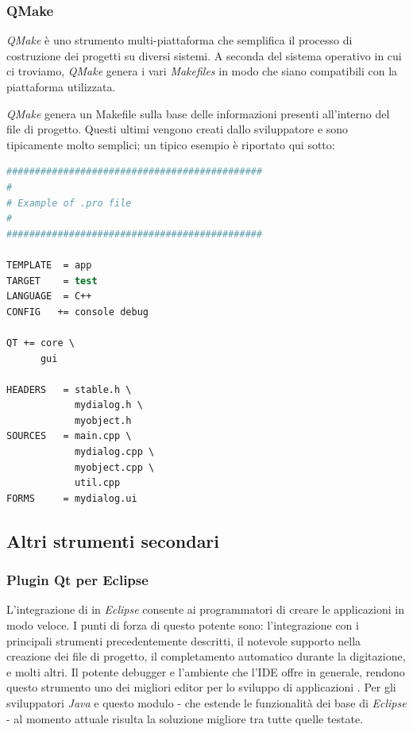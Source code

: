 \subsubsection{QMake}
\emph{QMake} è uno strumento multi-piattaforma che semplifica il processo di costruzione dei progetti \qt{} su diversi sistemi. A seconda del sistema operativo in cui ci troviamo, \emph{QMake} genera i vari  \emph{Makefiles} in modo che siano compatibili con la piattaforma utilizzata.

\emph{QMake} genera un Makefile sulla base delle informazioni presenti all'interno del file di progetto. Questi ultimi vengono creati dallo sviluppatore e sono tipicamente molto semplici; un tipico esempio è riportato qui sotto:

\begin{lstlisting}[language=csh]
#############################################
#
# Example of .pro file
#
#############################################

TEMPLATE  = app
TARGET    = test
LANGUAGE  = C++
CONFIG   += console debug

QT += core \
      gui

HEADERS   = stable.h \
            mydialog.h \
            myobject.h
SOURCES   = main.cpp \
            mydialog.cpp \
            myobject.cpp \
            util.cpp
FORMS     = mydialog.ui
\end{lstlisting}

\subsection{Altri strumenti secondari}

\subsubsection{Plugin Qt per Eclipse}
L'integrazione di \qt{} in \emph{Eclipse} consente ai programmatori di creare le applicazioni in modo veloce. I punti di forza di questo potente \plugin{} sono: l'integrazione con i principali strumenti \qt{} precedentemente descritti, il notevole supporto nella creazione dei file di progetto, il completamento automatico durante la digitazione, e molti altri. Il potente debugger e l'ambiente che l'IDE offre in generale, rendono questo strumento uno dei migliori editor per lo sviluppo di applicazioni \qt{}.
Per gli sviluppatori \emph{Java} e \cpp{} questo modulo - che estende le funzionalità dei \plugin{} base di \emph{Eclipse} - al momento attuale risulta la soluzione migliore tra tutte quelle testate.

